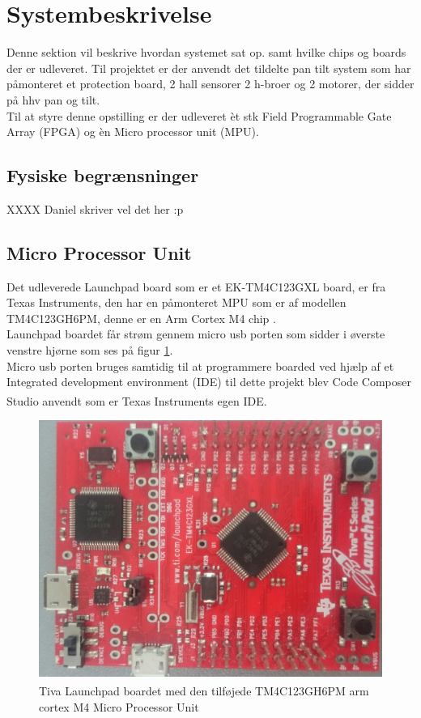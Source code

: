 \section{Systembeskrivelse}
Denne sektion vil beskrive hvordan systemet sat op. samt hvilke chips og boards der er udleveret.
Til projektet er der anvendt det tildelte pan tilt system som har påmonteret et protection board, 2 hall sensorer 2 h-broer og 2 motorer, der sidder på hhv pan og tilt.\\
Til at styre denne opstilling er der udleveret èt stk Field Programmable Gate Array (FPGA) og èn Micro processor unit (MPU).
\\

\subsection{Fysiske begrænsninger}
XXXX Daniel skriver vel det her :p

\subsection{Micro Processor Unit}
Det udleverede Launchpad board som er et EK-TM4C123GXL board, er fra Texas Instruments, den har en påmonteret MPU som er af modellen TM4C123GH6PM, denne er en Arm Cortex M4 chip \cite{TM4C123GH6PMDatasheet}.\\
Launchpad boardet får strøm gennem micro usb porten som sidder i øverste venstre hjørne som ses på figur \ref{fig:TivaLaunchPad}.\\
Micro usb porten bruges samtidig til at programmere boarded ved hjælp af et Integrated development environment (IDE) til dette projekt blev Code Composer Studio \textsuperscript{\texttrademark} anvendt som er Texas Instruments egen IDE.

\begin{figure}[!ht]
	\begin{center}
		\includegraphics[scale=0.1, angle =270]{Billeder/TivaLaunchPad.JPG}
	\end{center}
\caption{Tiva\textsuperscript{\texttrademark} Launchpad boardet med den tilføjede TM4C123GH6PM arm cortex M4 Micro Processor Unit}
\label{fig:TivaLaunchPad}
\end{figure}

